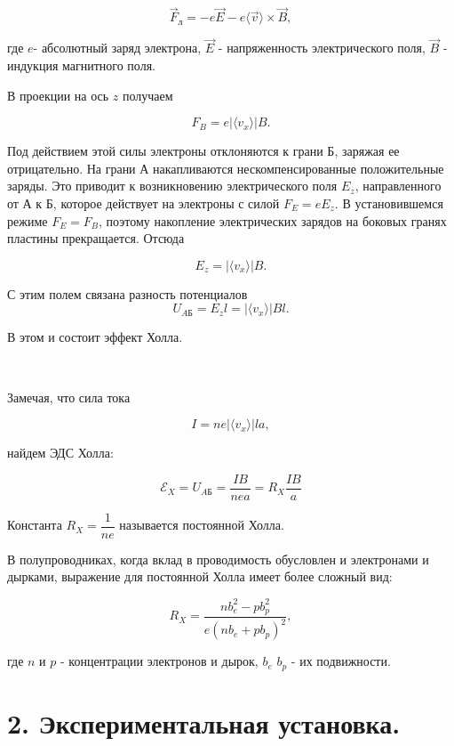 \documentclass[a4paper,12pt]{article}
\begin{document}
	$$\vec{F}_{л} = -e\vec{E}-e \langle \vec{v} \rangle \times \vec{B},$$
	
	где $e$- абсолютный заряд электрона, $\vec{E}$ - напряженность электрического поля, $\vec{B}$ - индукция магнитного поля.
	
	В проекции на ось $z$ получаем
	
	$$ F_{B}=e | \langle {v_{x}} \rangle | B.$$
	
	Под действием этой силы электроны отклоняются к грани Б, заряжая ее отрицательно. На грани А накапливаются нескомпенсированные положительные заряды. Это приводит к возникновению электрического поля $E_{z}$, направленного от А к Б, которое действует на электроны с силой $F_{E}=eE_{z}$. В установившемся режиме $F_{E}=F_{B}$, поэтому накопление электрических зарядов на боковых гранях пластины прекращается. Отсюда
	
	$$ E_{z}=| \langle {v_{x}} \rangle | B.$$
	
	С этим полем связана разность потенциалов $$U_{AБ}=E_{z}l=| \langle {v_{x}} \rangle | Bl.$$
	
	В этом и состоит эффект Холла.
	
	\
	
	Замечая, что сила тока
	
	$$ I=ne| \langle {v_{x}} \rangle |la,$$
	
	найдем ЭДС Холла:
	
\begin{equation}\label{Rx}
\mathscr{E}_{X}=U_{AБ}=\dfrac{IB}{nea}=R_{X}\dfrac{IB}{a}
\end{equation}
	
	Константа $R_{X}=\dfrac{1}{ne}$ называется постоянной Холла.
	
	В полупроводниках, когда вклад в проводимость обусловлен и электронами и дырками, выражение для постоянной Холла имеет более сложный вид:
	
	$$R_{X}=\dfrac{nb^{2}_{e}-pb^{2}_{p}}{e(nb_{e}+pb_{p})^{2}},$$
	
	где $n$ и $p$ - концентрации электронов и дырок, $b_{e}$ $b_{p}$ - их подвижности.

 \section*{2. Экспериментальная установка.}
\end{document}
